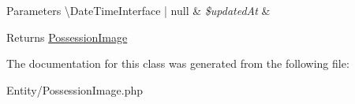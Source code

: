 \begin{DoxyParams}[1]{Parameters}
\textbackslash{}\+Date\+Time\+Interface | null & {\em \$updated\+At} & \\
\hline
\end{DoxyParams}
\begin{DoxyReturn}{Returns}
\mbox{\hyperlink{class_app_1_1_entity_1_1_possession_image}{Possession\+Image}} 
\end{DoxyReturn}


The documentation for this class was generated from the following file\+:\begin{DoxyCompactItemize}
\item 
Entity/Possession\+Image.\+php\end{DoxyCompactItemize}
